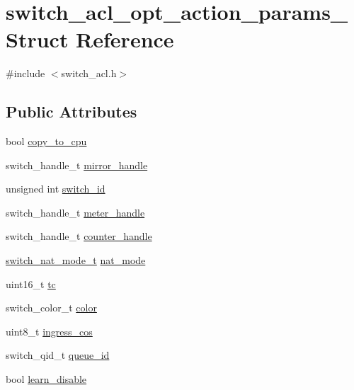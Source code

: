 \hypertarget{structswitch__acl__opt__action__params__}{\section{switch\+\_\+acl\+\_\+opt\+\_\+action\+\_\+params\+\_\+ Struct Reference}
\label{structswitch__acl__opt__action__params__}
}


{\ttfamily \#include $<$switch\+\_\+acl.\+h$>$}

\subsection*{Public Attributes}
\begin{DoxyCompactItemize}
\item 
bool \hyperlink{structswitch__acl__opt__action__params___ab257b14cc3d1e2e0c6a907dafd194274}{copy\+\_\+to\+\_\+cpu}
\item 
switch\+\_\+handle\+\_\+t \hyperlink{structswitch__acl__opt__action__params___a762a45070abad85392cd8720a7192b15}{mirror\+\_\+handle}
\item 
unsigned int \hyperlink{structswitch__acl__opt__action__params___ac015d7727a6af66735d176f0ef8219ce}{switch\+\_\+id}
\item 
switch\+\_\+handle\+\_\+t \hyperlink{structswitch__acl__opt__action__params___a1c759b1d7261446f14cecfc51e3777cb}{meter\+\_\+handle}
\item 
switch\+\_\+handle\+\_\+t \hyperlink{structswitch__acl__opt__action__params___a073717f19037971ea71f8edbf059a1a8}{counter\+\_\+handle}
\item 
\hyperlink{group__NAT_gaa9738ba923f6bdce6435354dd82f664a}{switch\+\_\+nat\+\_\+mode\+\_\+t} \hyperlink{structswitch__acl__opt__action__params___a10f98e3d7a7d9a7c89cd19f8cdc7e0c7}{nat\+\_\+mode}
\item 
uint16\+\_\+t \hyperlink{structswitch__acl__opt__action__params___abf088a2001ccab5f8193b3a79b4a00ea}{tc}
\item 
switch\+\_\+color\+\_\+t \hyperlink{structswitch__acl__opt__action__params___a3bab0475bec6809fc0c1ca55af50e552}{color}
\item 
uint8\+\_\+t \hyperlink{structswitch__acl__opt__action__params___a6d854da22f7bf54651c8fb05cd51599d}{ingress\+\_\+cos}
\item 
switch\+\_\+qid\+\_\+t \hyperlink{structswitch__acl__opt__action__params___ad0ad0767eda1ff0b1802993f3c613bc9}{queue\+\_\+id}
\item 
bool \hyperlink{structswitch__acl__opt__action__params___a0feab97dd4aeb96cc00b5f6949daa7a4}{learn\+\_\+disable}
\end{DoxyCompactItemize}


